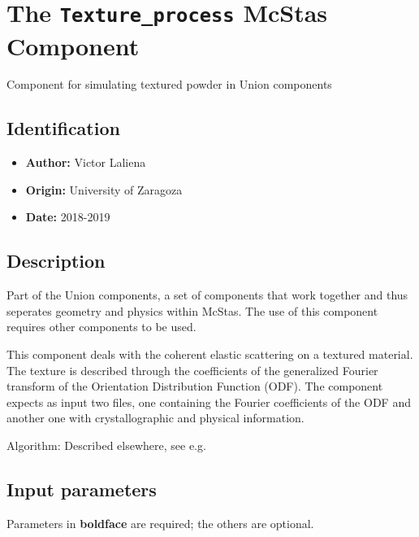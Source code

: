 \section{The \texttt{Texture\_process} McStas Component}
Component for simulating textured powder in Union components

\subsection*{Identification}
\begin{itemize}
  \item \textbf{Author:} Victor Laliena
  \item \textbf{Origin:} University of Zaragoza
  \item \textbf{Date:} 2018-2019
\end{itemize}

\subsection*{Description}
Part of the Union components, a set of components that work together and thus seperates geometry and physics within McStas. The use of this component requires other components to be used.

This component deals with the coherent elastic scattering on a textured material. The texture is described through the coefficients of the generalized Fourier transform of the Orientation Distribution Function (ODF). The component expects as input two files, one containing the Fourier coefficients of the ODF and another one with crystallographic and physical information.

Algorithm: Described elsewhere, see e.g. 

\subsection*{Input parameters}
Parameters in \textbf{boldface} are required; the others are optional.

